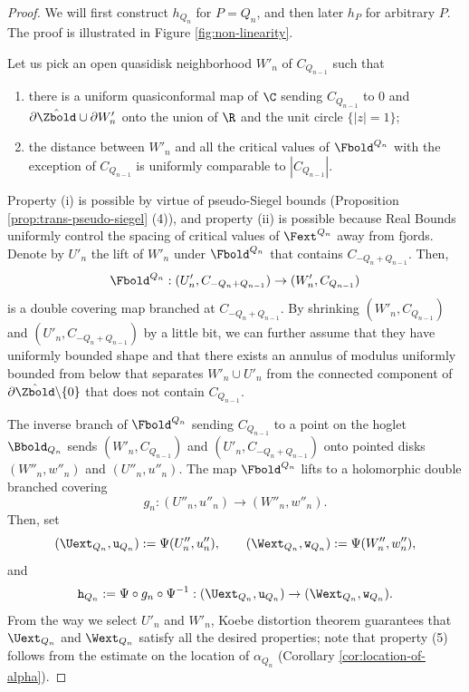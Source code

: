 \documentclass{amsart}
\begin{document}
\begin{proof}
    We will first construct $h_{Q_n}$ for $P = Q_n$, and then later $h_P$ for arbitrary $P$. 
    The proof is illustrated in Figure \ref{fig:non-linearity}.
    
    Let us pick an open quasidisk neighborhood $W'_n$ of $C_{Q_{n-1}}$ such that 
    \begin{enumerate}[label=\textnormal{(\roman*)}]
        \item there is a uniform quasiconformal map of $\C$ sending $C_{Q_{n-1}}$ to $0$ and $\partial \hat{\Zbold} \cup \partial W'_n$ onto the union of $\R$ and the unit circle $\{|z|=1\}$;
        \item the distance between $W'_n$ and all the critical values of $\Fbold^{Q_n}$ with the exception of $C_{Q_{n-1}}$ is uniformly comparable to $|C_{Q_{n-1}}|$.
    \end{enumerate} 
    Property (i) is possible by virtue of pseudo-Siegel bounds (Proposition \ref{prop:trans-pseudo-siegel} (4)), and property (ii) is possible because Real Bounds uniformly control the spacing of critical values of $\Fext^{Q_n}$ away from fjords. 
    Denote by $U'_n$ the lift of $W'_n$ under $\Fbold^{Q_n}$ that contains $C_{-Q_n+Q_{n-1}}$. 
    Then, 
    \[
    \Fbold^{Q_n}: (U'_n, C_{-Q_n+Q_{n-1}}) \to (W'_n, C_{Q_{n-1}})
    \]
    is a double covering map branched at $C_{-Q_n+Q_{n-1}}$. 
    By shrinking $(W'_n,C_{Q_{n-1}})$ and $(U'_n,C_{-Q_n+Q_{n-1}})$ by a little bit, we can further assume that they have uniformly bounded shape and that there exists an annulus of modulus uniformly bounded from below that separates $W'_n \cup U'_n$ from the connected component of $\partial \hat{\Zbold} \backslash \{0\}$ that does not contain $C_{Q_{n-1}}$.
    
    The inverse branch of $\Fbold^{Q_n}$ sending $C_{Q_{n-1}}$ to a point on the hoglet $\Bbold_{Q_n}$ sends $(W'_n,C_{Q_{n-1}})$ and $(U'_n,C_{-Q_n+Q_{n-1}})$ onto pointed disks $(W''_n, w''_n)$ and $(U''_n, u''_n)$. 
    The map $\Fbold^{Q_n}$ lifts to a holomorphic double branched covering 
    \[
    g_n: (U''_n,u''_n) \to (W''_n,w''_n).
    \]
    Then, set
    \[
    (\Uext_{Q_n}, \mathtt{u}_{Q_n}) := 
    \Psi(U''_n,u''_n), \qquad 
    (\Wext_{Q_n}, \mathtt{w}_{Q_n}) := \Psi(W''_n,w''_n),
    \]
    and 
    \[
        \mathtt{h}_{Q_n} := \Psi \circ g_n \circ \Psi^{-1}: (\Uext_{Q_n}, \mathtt{u}_{Q_n}) \to (\Wext_{Q_n}, \mathtt{w}_{Q_n}).
    \]
    From the way we select $U'_n$ and $W'_n$, Koebe distortion theorem guarantees that $\Uext_{Q_n}$ and $\Wext_{Q_n}$ satisfy all the desired properties; note that property (5) follows from the estimate on the location of $\alpha_{Q_n}$ (Corollary \ref{cor:location-of-alpha}).


\end{proof}
\end{document}
